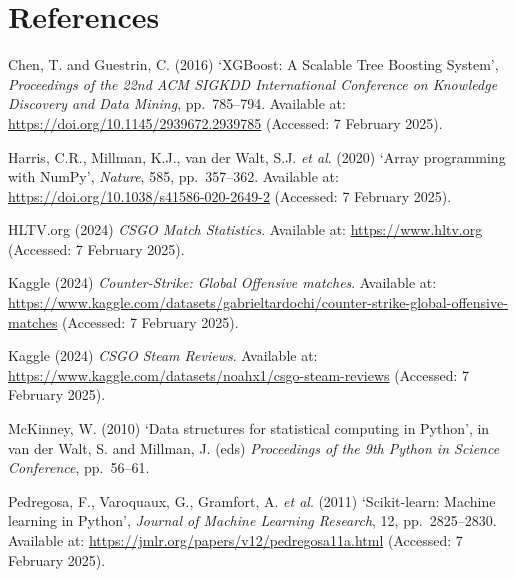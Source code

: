 \documentclass[12pt,a4paper]{article}
\begin{document}
\newpage
\section{References}

\begin{list}{}{%
  \setlength{\leftmargin}{2em}%
  \setlength{\itemindent}{-2em}%
  \setlength{\itemsep}{0.75em}%
  \setlength{\parsep}{0pt}}

\item Chen, T. and Guestrin, C. (2016) `XGBoost: A Scalable Tree Boosting System', \textit{Proceedings of the 22nd ACM SIGKDD International Conference on Knowledge Discovery and Data Mining}, pp.\ 785--794. Available at: \url{https://doi.org/10.1145/2939672.2939785} (Accessed: 7 February 2025).

\item Harris, C.R., Millman, K.J., van der Walt, S.J. \textit{et al}. (2020) `Array programming with NumPy', \textit{Nature}, 585, pp.\ 357--362. Available at: \url{https://doi.org/10.1038/s41586-020-2649-2} (Accessed: 7 February 2025).

\item HLTV.org (2024) \textit{CSGO Match Statistics}. Available at: \url{https://www.hltv.org} (Accessed: 7 February 2025).

\item Kaggle (2024) \textit{Counter-Strike: Global Offensive matches}. Available at: \url{https://www.kaggle.com/datasets/gabrieltardochi/counter-strike-global-offensive-matches} (Accessed: 7 February 2025).

\item Kaggle (2024) \textit{CSGO Steam Reviews}. Available at: \url{https://www.kaggle.com/datasets/noahx1/csgo-steam-reviews} (Accessed: 7 February 2025).

\item McKinney, W. (2010) `Data structures for statistical computing in Python', in van der Walt, S. and Millman, J. (eds) \textit{Proceedings of the 9th Python in Science Conference}, pp.\ 56--61.

\item Pedregosa, F., Varoquaux, G., Gramfort, A. \textit{et al}. (2011) `Scikit-learn: Machine learning in Python', \textit{Journal of Machine Learning Research}, 12, pp.\ 2825--2830. Available at: \url{https://jmlr.org/papers/v12/pedregosa11a.html} (Accessed: 7 February 2025).

\end{list}

\end{document}

